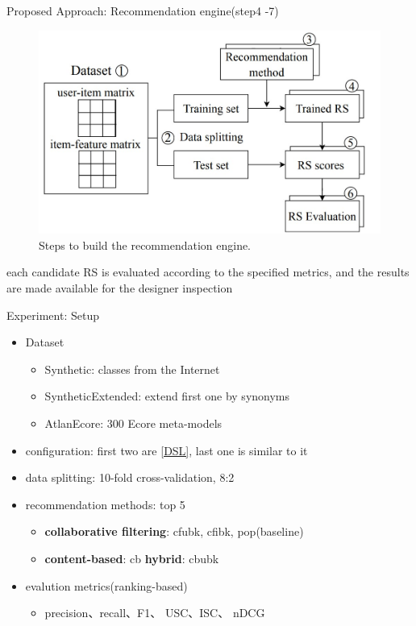 \documentclass{beamer}
\begin{document}
\begin{frame}{Proposed Approach: Recommendation engine(step4 -7)}
    \begin{figure}[htbp]
        \centering
        \includegraphics[width = 0.7\linewidth]{pic/RS引擎.jpg}
        \caption{ Steps to build the recommendation engine.}
    \end{figure}
    each candidate RS is evaluated according to the specified metrics, and the results are made available for the designer inspection
\end{frame}

\begin{frame}{Experiment: Setup}
    \begin{itemize}
        \item Dataset
        \begin{itemize}
            \item Synthetic: classes from the Internet
            \item SyntheticExtended: extend first one by synonyms
            \item AtlanEcore: 300 Ecore meta-models
        \end{itemize}
        \item configuration: first two are \ref{DSL}, last one is similar to it
        \item data splitting: 10-fold cross-validation, 8:2 
        \item recommendation methods: top 5
        \begin{itemize}
            \item \textbf{collaborative filtering}: cfubk, cfibk, pop(baseline)
            \item \textbf{content-based}: cb
             \textbf{hybrid}: cbubk
        \end{itemize}
        \item evalution metrics(ranking-based)
        \begin{itemize}
            \item precision、recall、F1、 USC、ISC、 nDCG
        \end{itemize}
    \end{itemize}
\end{frame}
\end{document}
